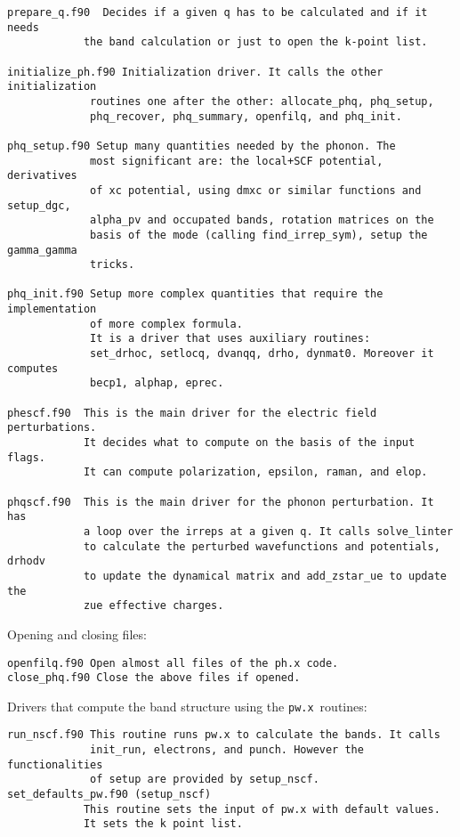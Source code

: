 \documentclass[12pt,a4paper]{article}
\def\pwx{\texttt{pw.x}}
\begin{document}
\begin{verbatim}
prepare_q.f90  Decides if a given q has to be calculated and if it needs
            the band calculation or just to open the k-point list.

initialize_ph.f90 Initialization driver. It calls the other initialization
             routines one after the other: allocate_phq, phq_setup,
             phq_recover, phq_summary, openfilq, and phq_init.               

phq_setup.f90 Setup many quantities needed by the phonon. The
             most significant are: the local+SCF potential, derivatives
             of xc potential, using dmxc or similar functions and setup_dgc,
             alpha_pv and occupated bands, rotation matrices on the 
             basis of the mode (calling find_irrep_sym), setup the gamma_gamma
             tricks.

phq_init.f90 Setup more complex quantities that require the implementation
             of more complex formula.
             It is a driver that uses auxiliary routines:
             set_drhoc, setlocq, dvanqq, drho, dynmat0. Moreover it computes
             becp1, alphap, eprec. 

phescf.f90  This is the main driver for the electric field perturbations.
            It decides what to compute on the basis of the input flags.
            It can compute polarization, epsilon, raman, and elop.

phqscf.f90  This is the main driver for the phonon perturbation. It has 
            a loop over the irreps at a given q. It calls solve_linter 
            to calculate the perturbed wavefunctions and potentials, drhodv 
            to update the dynamical matrix and add_zstar_ue to update the 
            zue effective charges.
\end{verbatim}

Opening and closing files:

\begin{verbatim}
openfilq.f90 Open almost all files of the ph.x code.
close_phq.f90 Close the above files if opened.                  
\end{verbatim}

Drivers that compute the band structure using the \pwx\ routines:

\begin{verbatim}
run_nscf.f90 This routine runs pw.x to calculate the bands. It calls
             init_run, electrons, and punch. However the functionalities
             of setup are provided by setup_nscf.
set_defaults_pw.f90 (setup_nscf)
            This routine sets the input of pw.x with default values. 
            It sets the k point list.
\end{verbatim}
\end{document}
